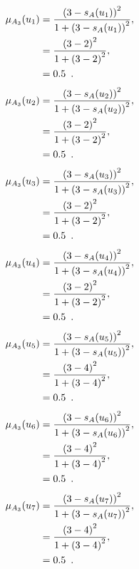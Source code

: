 \documentclass[a4paper,openany]{book}
\begin{document}
				\begin{align}
					\mu_{A_3}(u_1) &= \frac{\left(3-s_A(u_1)\right)^2}{1 + \left(3-s_A(u_1)\right)^2} ,\\
					&= \frac{\left(3-2\right)^2}{1 + \left(3-2\right)^2} \notag ,\\
					&= 0.5 \enspace. \notag
				\end{align}
				\begin{align}
					\mu_{A_3}(u_2) &= \frac{\left(3-s_A(u_2)\right)^2}{1 + \left(3-s_A(u_2)\right)^2} ,\\
					&= \frac{\left(3-2\right)^2}{1 + \left(3-2\right)^2} \notag ,\\
					&= 0.5 \enspace. \notag
				\end{align}
				\begin{align}
					\mu_{A_3}(u_3) &= \frac{\left(3-s_A(u_3)\right)^2}{1 + \left(3-s_A(u_3)\right)^2} ,\\
					&= \frac{\left(3-2\right)^2}{1 + \left(3-2\right)^2} \notag ,\\
					&= 0.5 \enspace. \notag
				\end{align}
				\begin{align}
					\mu_{A_3}(u_4) &= \frac{\left(3-s_A(u_4)\right)^2}{1 + \left(3-s_A(u_4)\right)^2} ,\\
					&= \frac{\left(3-2\right)^2}{1 + \left(3-2\right)^2} \notag ,\\
					&= 0.5 \enspace. \notag
				\end{align}
				\begin{align}
					\mu_{A_3}(u_5) &= \frac{\left(3-s_A(u_5)\right)^2}{1 + \left(3-s_A(u_5)\right)^2} ,\\
					&= \frac{\left(3-4\right)^2}{1 + \left(3-4\right)^2} \notag ,\\
					&= 0.5 \enspace. \notag
				\end{align}
				\begin{align}
					\mu_{A_3}(u_6) &= \frac{\left(3-s_A(u_6)\right)^2}{1 + \left(3-s_A(u_6)\right)^2} ,\\
					&= \frac{\left(3-4\right)^2}{1 + \left(3-4\right)^2} \notag ,\\
					&= 0.5 \enspace. \notag
				\end{align}
				\begin{align}
					\mu_{A_3}(u_7) &= \frac{\left(3-s_A(u_7)\right)^2}{1 + \left(3-s_A(u_7)\right)^2} ,\\
					&= \frac{\left(3-4\right)^2}{1 + \left(3-4\right)^2} \notag ,\\
					&= 0.5 \enspace. \notag
				\end{align}
\end{document}

